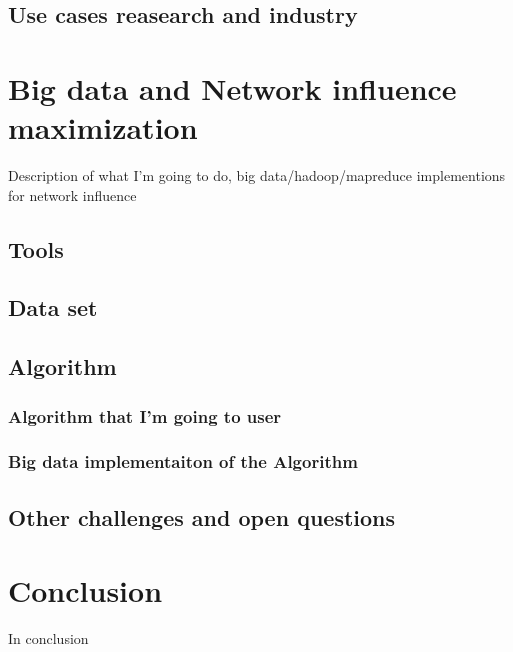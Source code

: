 \documentclass[english]{tktltiki}
\begin{document}
\subsection{Use cases reasearch and industry}



\section{Big data and Network influence maximization}

Description of what I'm going to do, big data/hadoop/mapreduce implementions for network influence


\subsection{Tools}




\subsection{Data set}





\subsection{Algorithm}
\subsubsection{Algorithm that I'm going to user}
\subsubsection{Big data implementaiton of the Algorithm}



\subsection{Other challenges and open questions}



\section{Conclusion}
In conclusion
\pagebreak







\lastpage

\appendices

\pagestyle{empty}
\end{document}
